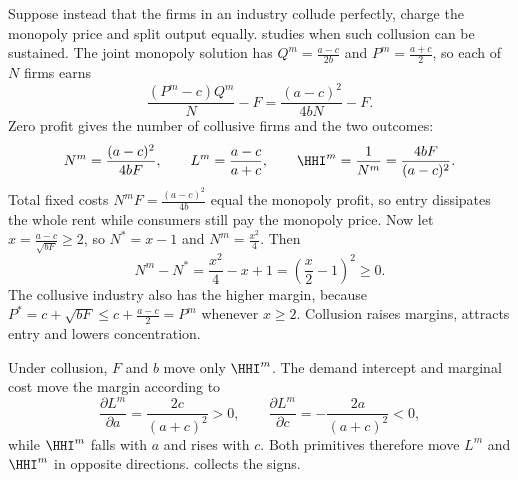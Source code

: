 Suppose instead that the firms in an industry collude perfectly,
charge the monopoly price and split output equally.  studies when such
collusion can be sustained. The joint monopoly solution has $Q^m = \frac{a - c}{2b}$ and $P^m = \frac{a + c}{2}$, so each of $N$ firms earns
\[
\frac{(P^m - c) Q^m}{N} - F = \frac{(a - c)^2}{4bN} - F.
\]
Zero profit gives the number of collusive firms and the two outcomes:
\begin{equation}\label{eq:01-collusion-fe}
N^m = \frac{(a - c)^2}{4bF}, \qquad L^m = \frac{a - c}{a + c}, \qquad
\HHI^m = \frac{1}{N^m} = \frac{4bF}{(a - c)^2}.
\end{equation}
Total fixed costs $N^m F = \frac{(a - c)^2}{4b}$ equal the monopoly profit, so entry dissipates the whole
rent while consumers still pay the monopoly price. Now let $x = \frac{a - c}{\sqrt{bF}} \ge 2$, so
$N^* = x - 1$ and $N^m = \frac{x^2}{4}$. Then
\[
N^m - N^* = \frac{x^2}{4} - x + 1 = \left( \frac{x}{2} - 1 \right)^2 \ge 0 .
\]
The collusive industry also has the higher margin, because $P^* = c + \sqrt{bF} \le c + \frac{a - c}{2}
= P^m$ whenever $x \ge 2$. Collusion raises margins, attracts entry and lowers concentration.

Under collusion, $F$ and $b$ move only $\HHI^m$. The demand intercept and marginal cost move the margin
according to
\[
\frac{\partial L^m}{\partial a} = \frac{2c}{(a + c)^2} > 0, \qquad
\frac{\partial L^m}{\partial c} = -\frac{2a}{(a + c)^2} < 0 ,
\]
while $\HHI^m$ falls with $a$ and rises with $c$. Both primitives therefore move $L^m$ and $\HHI^m$ in
opposite directions.  collects the signs.

